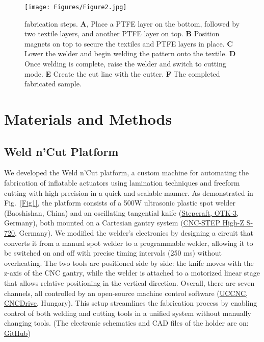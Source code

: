 \documentclass[journal, letterpaper]{IEEEtran}
\begin{document}
\begin{figure}[t]
\centering
\texttt{[image: Figures/Figure2.jpg]}
\caption{fabrication steps. \textbf{A}, Place a PTFE layer on the bottom, followed by two textile layers, and another PTFE layer on top. \textbf{B} Position magnets on top to secure the textiles and PTFE layers in place. \textbf{C} Lower the welder and begin welding the pattern onto the textile. \textbf{D}  Once welding is complete, raise the welder and switch to cutting mode. \textbf{E} Create the cut line with the cutter. \textbf{F} The completed fabricated sample.}
\label{Fig2}
\end{figure}

\section{Materials and Methods}
\label{sec:background}

\subsection{Weld n'Cut Platform}

We developed the Weld n'Cut platform, a custom machine for automating the fabrication of inflatable actuators using lamination techniques and freeform cutting with high precision in a quick and scalable manner. As demonstrated in Fig.~\ref{Fig1}, the platform consists of a 500W ultrasonic plastic spot welder (Baoshishan, China) and an oscillating tangential knife (\href{https://shop.stepcraft.us/shop/11024-oscillating-tangential-knife-otk-3-202808}{Stepcraft, OTK-3}, Germany), both mounted on a Cartesian gantry system (\href{https://www.cnc-step.com/high-z-s-720-cnc-router-720-x-420-x-110-mm-trapezium-screws}{CNC-STEP High-Z S-720}, Germany). We modified the welder’s electronics by designing a circuit that converts it from a manual spot welder to a programmable welder, allowing it to be switched on and off with precise timing intervals (250 ms) without overheating. The two tools are positioned side by side: the knife moves with the z-axis of the CNC gantry, while the welder is attached to a motorized linear stage that allows relative positioning in the vertical direction.
Overall, there are seven channels, all controlled by an open-source machine control software (\href{https://cncdrive.com/UCCNC.html}{UCCNC, CNCDrive}, Hungary). This setup streamlines the fabrication process by enabling control of both welding and cutting tools in a unified system without manually changing tools. (The electronic schematics and CAD files of the holder are on: \href{https://github.com/SDUSoftRobotics/Weldn-cut}{GitHub})
\end{document}
